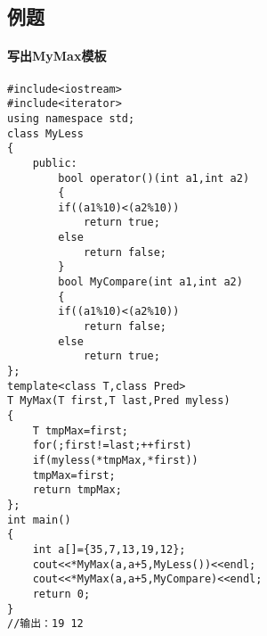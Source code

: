 \documentclass{article}
\begin{document}
\begin{CJK}{UTF8}{gbsn}
\section{例题}
\paragraph{写出MyMax模板}
\begin{verbatim}
#include<iostream>
#include<iterator>
using namespace std;
class MyLess
{
	public:
		bool operator()(int a1,int a2)
		{
		if((a1%10)<(a2%10))
			return true;
		else
			return false;
		}
		bool MyCompare(int a1,int a2)
		{
		if((a1%10)<(a2%10))
			return false;
		else
			return true;
};
template<class T,class Pred>
T MyMax(T first,T last,Pred myless)
{
	T tmpMax=first;
	for(;first!=last;++first)
	if(myless(*tmpMax,*first))
	tmpMax=first;
	return tmpMax;
};
int main()
{
	int a[]={35,7,13,19,12};
	cout<<*MyMax(a,a+5,MyLess())<<endl;
	cout<<*MyMax(a,a+5,MyCompare)<<endl;
	return 0;
}
//输出：19 12
\end{verbatim}
\end{CJK}
\end{document}
